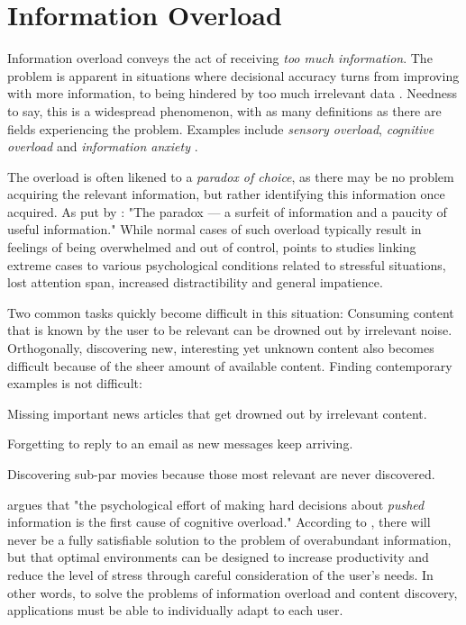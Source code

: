 \section{Information Overload}

Information overload conveys the act of receiving \emph{too much information}. 
The problem is apparent in situations where decisional accuracy turns from improving with more information, to being hindered by too much irrelevant data \cite[p13]{Bjorkoy2010d}. 
Needness to say, this is a widespread phenomenon, with as many definitions as there are fields experiencing the problem. Examples include \emph{sensory overload}, \emph{cognitive overload} and \emph{information anxiety} \citep{Eppler2004}.

The overload is often likened to a \emph{paradox of choice}, as there may be no problem acquiring the relevant information, but rather identifying this information once acquired. As put by \cite{Edmunds2000}: "The paradox --- a surfeit of information and a paucity of useful information."
While normal cases of such overload typically result in feelings of being overwhelmed and out of control, \cite{Bawden2008} points to studies linking extreme cases to various psychological conditions related to stressful situations, lost attention span, increased distractibility and general impatience.

Two common tasks quickly become difficult in this situation:
Consuming content that is known by the user to be relevant can be drowned out by irrelevant noise.
Orthogonally, discovering new, interesting yet unknown content also becomes difficult because of the sheer amount of available content.
Finding contemporary examples is not difficult:

\begin{itemize*}
  \item Missing important news articles that get drowned out by irrelevant content.
  \item Forgetting to reply to an email as new messages keep arriving.
  \item Discovering sub-par movies because those most relevant are never discovered.
\end{itemize*}

\cite{Kirsh2000} argues that "the psychological effort of making hard decisions about \emph{pushed} information is the first cause of cognitive overload." 
According to \citeauthor{Kirsh2000}, there will never be a fully satisfiable solution to the problem of overabundant information, 
but that optimal environments can be designed to increase productivity and reduce the level of stress through careful consideration of the user's needs. 
In other words, to solve the problems of information overload and content discovery, applications must be able to individually adapt to each user. 

